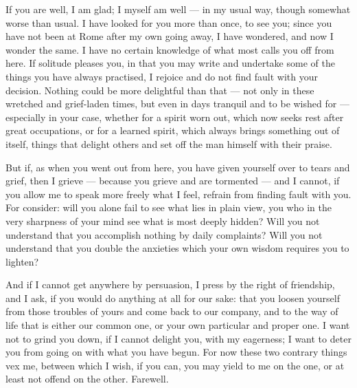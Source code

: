 

 If you are well, I am glad; I myself am well --- in my usual way, though somewhat worse than usual. I have looked for you more than once, to see you; since you have not been at Rome after my own going away, I have wondered, and now I wonder the same. I have no certain knowledge of what most calls you off from here. If solitude pleases you, in that you may write and undertake some of the things you have always practised, I rejoice and do not find fault with your decision. Nothing could be more delightful than that --- not only in these wretched and grief-laden times, but even in days tranquil and to be wished for --- especially in your case, whether for a spirit worn out, which now seeks rest after great occupations, or for a learned spirit, which always brings something out of itself, things that delight others and set off the man himself with their praise.

 But if, as when you went out from here, you have given yourself over to tears and grief, then I grieve --- because you grieve and are tormented --- and I cannot, if you allow me to speak more freely what I feel, refrain from finding fault with you. For consider: will you alone fail to see what lies in plain view, you who in the very sharpness of your mind see what is most deeply hidden? Will you not understand that you accomplish nothing by daily complaints? Will you not understand that you double the anxieties which your own wisdom requires you to lighten?

 And if I cannot get anywhere by persuasion, I press by the right of friendship, and I ask, if you would do anything at all for our sake: that you loosen yourself from those troubles of yours and come back to our company, and to the way of life that is either our common one, or your own particular and proper one. I want not to grind you down, if I cannot delight you, with my eagerness; I want to deter you from going on with what you have begun. For now these two contrary things vex me, between which I wish, if you can, you may yield to me on the one, or at least not offend on the other. Farewell.
